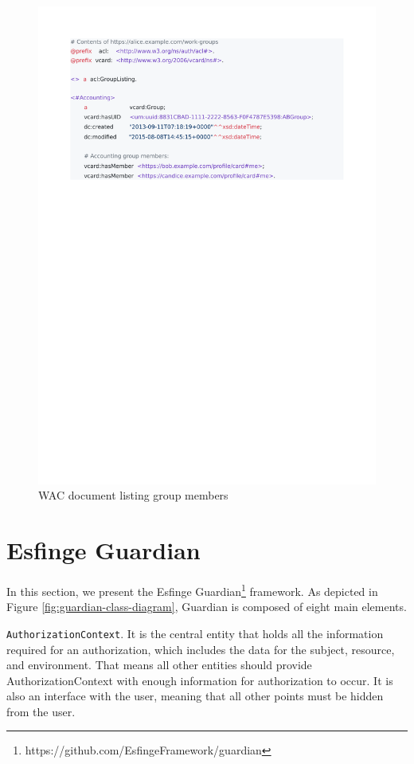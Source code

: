 \documentclass[sigconf]{acmart}
\begin{document}
\begin{figure}
  \includegraphics[trim=2cm 19cm 4.7cm 2cm, clip, scale=0.57]{pdf/work-groups}
  \caption{WAC document listing group members}
  \label{fig:group-listing}
\end{figure}



\section{Esfinge Guardian}
In this section, we present the Esfinge Guardian\footnote{https://github.com/EsfingeFramework/guardian} framework. As depicted in Figure \ref{fig:guardian-class-diagram}, Guardian is composed of eight main elements.


\cite{Guerra2015}

\noindent \verb|AuthorizationContext|. It is the central entity that holds all the information required for an authorization, which includes the data for the subject, resource, and environment. That means all other entities should provide AuthorizationContext with enough information for authorization to occur. It is also an interface with the user, meaning that all other points must be hidden from the user.
\end{document}
